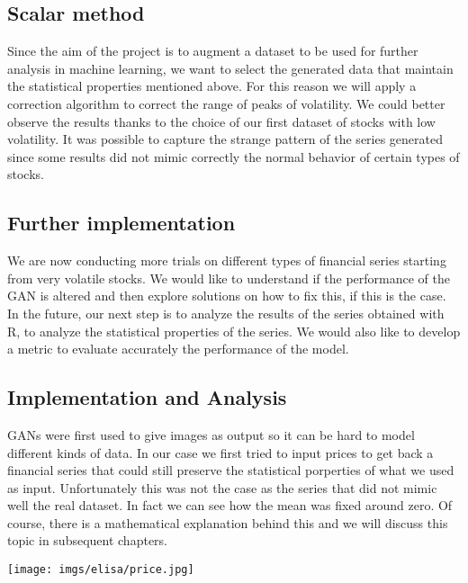 \documentclass{article}
\begin{document}
    \subsection*{Scalar method}
    Since the aim of the project is to augment a dataset to be used for further analysis in machine learning, we want to select the generated data that maintain the statistical properties mentioned above. For this reason we will apply a correction algorithm to correct the range of peaks of volatility. We could better observe the results thanks to the choice of our first dataset of stocks with low volatility. It was possible to capture the strange pattern of the series generated since some results did not mimic correctly  the normal behavior of certain types of stocks.\\ 
    
    \subsection*{Further implementation}
   We are now conducting more trials on different types of financial series starting from very volatile stocks. We would like to understand if the performance of the GAN is altered and then explore solutions on how to fix this, if this is the case.  In the future, our next step is to analyze the results of the series obtained with R, to analyze the statistical properties of the series. We would also like to develop a metric to evaluate accurately the performance of the model.\\

    \subsection*{Implementation and Analysis}
    GANs were first used to give images as output so it can be hard to model different kinds of data. In our case we first tried to input prices to get back a financial series that could still preserve the statistical porperties of what we used as input. Unfortunately this was not the case as the series that did not mimic well the real dataset. In fact we can see how the mean was fixed around zero. Of course, there is a mathematical explanation behind this and we will discuss this topic in subsequent chapters.\\
    
    \begin{center}
        \texttt{[image: imgs/elisa/price.jpg]}
    \end{center}
\end{document}
